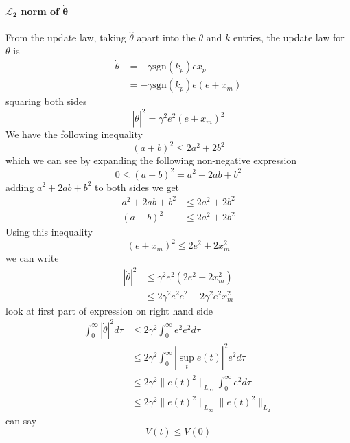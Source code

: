 \paragraph{$\boldsymbol{\mathcal{L}_{2}}$ norm of $\boldsymbol{\dot{\theta}}$}
From the update law, taking $\hat{\theta}$ apart into the $\theta$ and $k$ entries, the update law for $\theta$ is
\begin{align*}
  \dot{\theta}&=-\gamma\text{sgn}(k_{p})ex_{p} \\
  &=-\gamma\text{sgn}(k_{p})e(e+x_{m})
\end{align*}
squaring both sides
\begin{equation*}
  |\dot{\theta}|^{2}=\gamma^{2}e^{2}(e+x_{m})^{2}
\end{equation*}
We have the following inequality
\begin{equation*}
  (a+b)^{2}\leq2a^{2}+2b^{2}
\end{equation*}
which we can see by expanding the following non-negative expression
\begin{equation*}
  0\leq(a-b)^{2}=a^{2}-2ab+b^{2}
\end{equation*}
adding $a^{2}+2ab+b^{2}$ to both sides we get
\begin{align*}
  a^{2}+2ab+b^{2}&\leq2a^{2}+2b^{2} \\
  (a+b)^{2}&\leq2a^{2}+2b^{2}
\end{align*}
Using this inequality
\begin{equation*}
  (e+x_{m})^{2}\leq2e^{2}+2x_{m}^{2}
\end{equation*}
we can write
\begin{align*}
  |\dot{\theta}|^{2}&\leq\gamma^{2}e^{2}(2e^{2}+2x_{m}^{2}) \\
  &\leq2\gamma^{2}e^{2}e^{2}+2\gamma^{2}e^{2}x_{m}^{2}
\end{align*}
look at first part of expression on right hand side
\begin{align*}
  \int_{0}^{\infty}|\dot{\theta}|^{2}d\tau
  &\leq2\gamma^{2}\int_{0}^{\infty}e^{2}e^{2}d\tau \\
  &\leq2\gamma^{2}\int_{0}^{\infty}|\sup_{t}e(t)|^{2}e^{2}d\tau \\
  &\leq2\gamma^{2}\|e(t)^{2}\|_{L_{\infty}}\int_{0}^{\infty}e^{2}d\tau \\
  &\leq2\gamma^{2}\|e(t)^{2}\|_{L_{\infty}}\|e(t)^{2}\|_{L_{2}}
\end{align*}
can say
\begin{equation*}
  V(t)\leq V(0)
\end{equation*}
